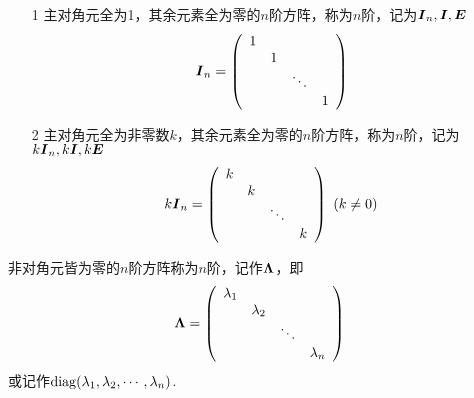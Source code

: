 \begin{frame}
\begin{dingyi}[单位矩阵与数量矩阵]
  \begin{itemize}
  \item[1] 主对角元全为1，其余元素全为零的$n$阶方阵，称为$n$阶，记为$\boldsymbol{I}_n, \boldsymbol{I}, \boldsymbol{E}$
    $$
    \boldsymbol{I}_n = \left(
      \begin{array}{cccc}
        1 & & &\\
          & 1 & & \\
          & & \ddots & \\
          & & & 1
      \end{array}
    \right)
    $$ 
  \item[2] 主对角元全为非零数$k$，其余元素全为零的$n$阶方阵，称为$n$阶，记为$k\boldsymbol{I}_n, k\boldsymbol{I}, k\boldsymbol{E}$
    $$
    k\boldsymbol{I}_n = \left(
      \begin{array}{cccc}
        k & & &\\
          & k & & \\
          & & \ddots & \\
          & & & k
      \end{array}
    \right)~(k\ne 0)
    $$
  \end{itemize}
\end{dingyi}
\end{frame}

\begin{frame}
\begin{dingyi}[对角矩阵]
  非对角元皆为零的$n$阶方阵称为$n$阶，记作$\boldsymbol{\Lambda}$，即
  $$
  \boldsymbol{\Lambda} = \left(
    \begin{array}{cccc}
      \lambda_1 & & &\\
                & \lambda_2 & & \\
                & & \ddots & \\
                & & & \lambda_n
    \end{array}
  \right)
  $$
  或记作$\mathrm{diag}(\lambda_1,\lambda_2,\cdots,\lambda_n)$.
\end{dingyi}
\end{frame}

